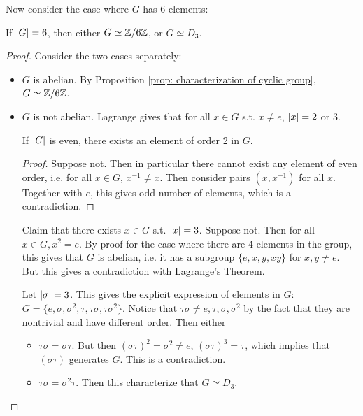 \documentclass{article}
\begin{document}
Now consider the case where $G$ has 6 elements:

\begin{proposition}
    If $\left|G\right| = 6$, then either $G \simeq \mathbb{Z}/6\mathbb{Z}$, or $G \simeq D_3$. 
\end{proposition}

\begin{proof}
    Consider the two cases separately:
    \begin{itemize}
        \item $G$ is abelian. By Proposition \ref{prop: characterization of cyclic group}, $G \simeq \mathbb{Z}/6\mathbb{Z}$.
        \item $G$ is not abelian. Lagrange gives that for all $x \in G$ s.t. $x \neq e$, $\left|x\right| = 2$ or $3$.
        \begin{lemma}
            If $\left|G\right|$ is even, there exists an element of order 2 in $G$.
        \end{lemma}
        \begin{proof}
            Suppose not. Then in particular there cannot exist any element of even order, i.e. for all $x \in G$, $x^{-1} \neq x$. Then consider pairs $(x, x^{-1})$ for all $x$. Together with $e$, this gives odd number of elements, which is a contradiction.
        \end{proof}
        Claim that there exists $x \in G$ s.t. $\left|x\right| = 3$. Suppose not. Then for all $x \in G, x^2 = e$. By proof for the case where there are 4 elements in the group, this gives that $G$ is abelian, i.e. it has a subgroup $\{ e, x, y, xy \}$ for $x, y \neq e$. But this gives a contradiction with Lagrange's Theorem.

        Let $\left|\sigma\right| = 3$. This gives the explicit expression of elements in $G$: $G = \{e, \sigma, \sigma^2, \tau, \tau\sigma, \tau\sigma^2\}$. Notice that $\tau\sigma \neq e, \tau, \sigma, \sigma^2$ by the fact that they are nontrivial and have different order. Then either
        \begin{itemize}
            \item $\tau\sigma = \sigma\tau$. But then $(\sigma\tau)^2 = \sigma^2 \neq e$, $(\sigma\tau)^3 = \tau$, which implies that $(\sigma\tau)$ generates $G$. This is a contradiction.
            \item $\tau\sigma = \sigma^2\tau$. Then this characterize that $G \simeq D_3$.
        \end{itemize}
    \end{itemize}
\end{proof}
\end{document}
